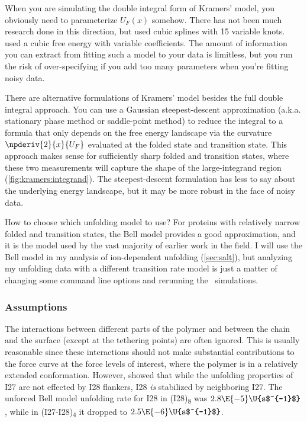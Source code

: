When you are simulating the double integral form of Kramers' model,
you obviously need to parameterize $U_F(x)$ somehow.  There has not
been much research done in this direction, but \citet{schlierf06} used
cubic splines with 15 variable knots.  \citet{shillcock98} used a
cubic free energy with variable coefficients.  The amount of
information you can extract from fitting such a model to your data is
limitless, but you run the risk of over-specifying if you add too many
parameters when you're fitting noisy data.

There are alternative formulations of Kramers' model besides the full
double integral approach.  You can use a Gaussian steepest-descent
approximation (a.k.a. stationary phase method or saddle-point method)
to reduce the integral to a formula that only depends on the free
energy landscape via the curvature $\npderiv{2}{x}{U_F}$ evaluated at
the folded state and transition state\citep{hanggi90}.  This approach
makes sense for sufficiently sharp folded and transition states, where
these two measurements will capture the shape of the large-integrand
region (\cref{fig:kramers:integrand}).  The steepest-descent
formulation has less to say about the underlying energy landscape, but
it may be more robust in the face of noisy data.

How to choose which unfolding model to use?  For proteins with
relatively narrow folded and transition states, the Bell model
provides a good approximation, and it is the model used by the vast
majority of earlier work in the field.  I will use the Bell model in
my analysis of ion-dependent unfolding (\cref{sec:salt}), but
analyzing my unfolding data with a different transition rate model is
just a matter of changing some command line options and rerunning the
\sawsim\ simulations.

\subsubsection{Assumptions}
\label{sec:sawsim:rate:assumptions}

The interactions between different parts of the polymer and between
the chain and the surface (except at the tethering points) are often
ignored.  This is usually reasonable since these interactions should
not make substantial contributions to the force curve at the force
levels of interest, where the polymer is in a relatively extended
conformation.  However, \citet{li00} showed that while the unfolding
properties of I27 are not effected by I28 flankers, I28 \emph{is}
stabilized by neighboring I27.  The unforced Bell model unfolding rate
for I28 in (I28)\textsubscript{8} was $2.8\E{-5}\U{s$^{-1}$}$, while
in (I27-I28)\textsubscript{4} it dropped to
$2.5\E{-6}\U{s$^{-1}$}$\citep{li00}.

